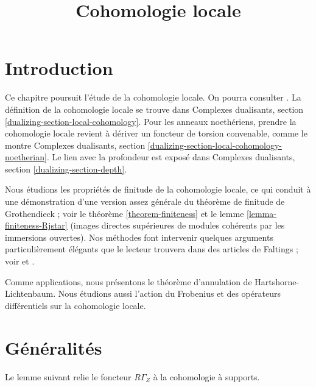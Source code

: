 

%


\title{Cohomologie locale}


\maketitle

\label{section-phantom}

\tableofcontents

\section{Introduction}
\label{section-introduction}

\noindent
Ce chapitre poursuit l'étude de la cohomologie locale. On pourra consulter \cite{SGA2}. La définition de la cohomologie locale se trouve dans Complexes dualisants, section \ref{dualizing-section-local-cohomology}. Pour les anneaux noethériens, prendre la cohomologie locale revient à dériver un foncteur de torsion convenable, comme le montre Complexes dualisants, section \ref{dualizing-section-local-cohomology-noetherian}. Le lien avec la profondeur est exposé dans Complexes dualisants, section \ref{dualizing-section-depth}.

\medskip\noindent
Nous étudions les propriétés de finitude de la cohomologie locale, ce qui conduit à une démonstration d'une version assez générale du théorème de finitude de Grothendieck ; voir le théorème \ref{theorem-finiteness} et le lemme \ref{lemma-finiteness-Rjstar} (images directes supérieures de modules cohérents par les immersions ouvertes). Nos méthodes font intervenir quelques arguments particulièrement élégants que le lecteur trouvera dans des articles de Faltings ; voir \cite{Faltings-annulators} et \cite{Faltings-finiteness}.

\medskip\noindent
Comme applications, nous présentons le théorème d'annulation de Hartshorne-Lichtenbaum. Nous étudions aussi l'action du Frobenius et des opérateurs différentiels sur la cohomologie locale.




\section{Généralités}
\label{section-generalities}

\noindent
Le lemme suivant relie le foncteur $R\Gamma_Z$ à la cohomologie à supports.


